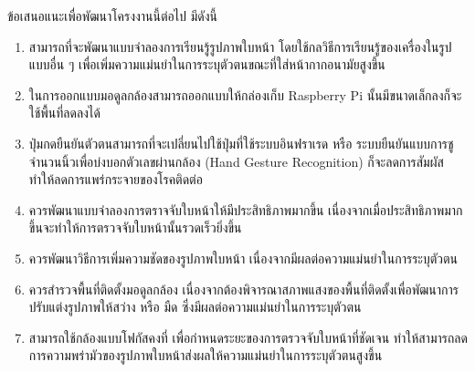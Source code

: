 ข้อเสนอแนะเพื่อพัฒนาโครงงานนี้ต่อไป มีดังนี้
\begin{enumerate}
    \item สามารถที่จะพัฒนาแบบจำลองการเรียนรู้รูปภาพใบหน้า โดยใช้กลวิธีการเรียนรู้ของเครื่องในรูปแบบอื่น ๆ เพื่อเพิ่มความแม่นยำในการระบุตัวตนขณะที่ใส่หน้ากากอนามัยสูงขึ้น
    \item ในการออกแบบมอดูลกล้องสามารถออกแบบให้กล่องเก็บ Raspberry Pi นั้นมีขนาดเล็กลงก็จะใช้พื้นที่ลดลงได้
    \item ปุ่มกดยืนยันตัวตนสามารถที่จะเปลี่ยนไปใช้ปุ่มที่ใช้ระบบอินฟราเรด หรือ ระบบยืนยันแบบการชูจำนวนนิ้วเพื่อบ่งบอกตัวเลขผ่านกล้อง (Hand Gesture Recognition) ก็จะลดการสัมผัสทำให้ลดการแพร่กระจายของโรคติดต่อ 
    \item ควรพัฒนาแบบจำลองการตราจจับใบหน้าให้มีประสิทธิภาพมากขึ้น เนื่องจากเมื่อประสิทธิภาพมากขึ้นจะทำให้การตรวจจับใบหน้านั้นรวดเร็วยิ่งขึ้น
    \item ควรพัฒนาวิธีการเพิ่มความชัดของรูปภาพใบหน้า เนื่องจากมีผลต่อความแม่นยำในการระบุตัวตน
    \item ควรสำรวจพื้นที่ติดตั้งมอดูลกล้อง เนื่องจากต้องพิจารณาสภาพแสงของพื้นที่ติดตั้งเพื่อพัฒนาการปรับแต่งรูปภาพให้สว่าง หรือ มืด ซึ่งมีผลต่อความแม่นยำในการระบุตัวตน
    \item สามารถใช้กล้องแบบโฟกัสคงที่ เพื่อกำหนดระยะของการตรวจจับใบหน้าที่ชัดเจน ทำให้สามารถลดการความพร่ามัวของรูปภาพใบหน้าส่งผลให้ความแม่นยำในการระบุตัวตนสูงขึ้น 
\end{enumerate}
